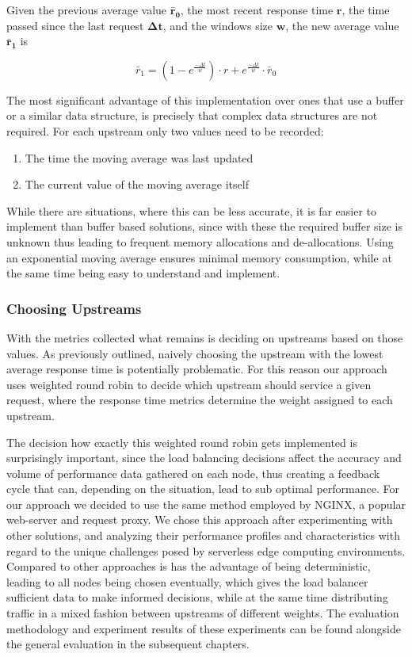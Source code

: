 Given the previous average value $\mathbf{\bar{r}_{0}}$, the most recent response time $\mathbf{r}$, the time passed since the last request $\mathbf{\Delta t}$, and the windows size $\mathbf{w}$, the new average value $\mathbf{\bar{r}_{1}}$ is

\[\bar{r}_{1} = (1 - e^{\frac{-\Delta t}{w}}) \cdot r + e^{\frac{-\Delta t}{w}} \cdot \bar{r}_{0}\]

The most significant advantage of this implementation over ones that use a buffer or a similar data structure, is precisely that complex data structures are not required. For each upstream only two values need to be recorded:
\begin{enumerate}
    \item The time the moving average was last updated
    \item The current value of the moving average itself
\end{enumerate}
While there are situations, where this can be less accurate, it is far easier to implement than buffer based solutions, since with these the required buffer size is unknown thus leading to frequent memory allocations and de-allocations.
Using an exponential moving average ensures minimal memory consumption, while at the same time being easy to understand and implement.

\subsubsection{Choosing Upstreams}
With the metrics collected what remains is deciding on upstreams based on those values. As previously outlined, naively choosing the upstream with the lowest average response time is potentially problematic.
For this reason our approach uses weighted round robin to decide which upstream should service a given request, where the response time metrics determine the weight assigned to each upstream.

The decision how exactly this weighted round robin gets implemented is surprisingly important, since the load balancing decisions affect the accuracy and volume of performance data gathered on each node, thus creating a feedback cycle that can, depending on the situation, lead to sub optimal performance.
For our approach we decided to use the same method employed by NGINX\cite{nginx}, a popular web-server and request proxy.
We chose this approach after experimenting with other solutions, and analyzing their performance profiles and characteristics with regard to the unique challenges posed by serverless edge computing environments.
Compared to other approaches is has the advantage of being deterministic, leading to all nodes being chosen eventually, which gives the load balancer sufficient data to make informed decisions, while at the same time distributing traffic in a mixed fashion between upstreams of different weights.
The evaluation methodology and experiment results of these experiments can be found alongside the general evaluation in the subsequent chapters.

